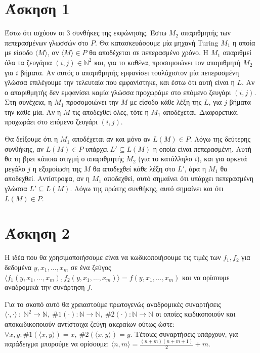 \documentclass[a4paper, oneside, 11pt]{article}
\theoremstyle{definition}
\begin{document}


\section*{Άσκηση 1}
Έστω ότι ισχύουν οι 3 συνθήκες της εκφώνησης. Έστω $M_2$ απαριθμητής των πεπερασμένων γλωσσών στο $P$. Θα κατασκευάσουμε μία μηχανή Turing $M_1$ η οποία
με είσοδο $\langle M\rangle$, αν $\langle M\rangle\in P$ θα αποδέχεται σε πεπερασμένο χρόνο. Η $M_1$ απαριθμεί όλα τα ζευγάρια
$(i,j)\in \mathbb{N}^2$ και, για το καθένα, προσομοιώνει τον απαριθμητή $M_2$ για $i$ βήματα. Αν αυτός ο απαριθμητής εμφανίσει τουλάχιστον μία
πεπερασμένη γλώσσα επιλέγουμε την τελευταία που εμφανίστηκε, και έστω ότι αυτή είναι η $L$. Αν ο απαριθμητής δεν εμφανίσει καμία γλώσσα προχωράμε στο
επόμενο ζευγάρι $(i,j)$. Στη συνέχεια, η $M_1$ προσομοιώνει την $M$ με είσοδο κάθε λέξη της $L$, για $j$ βήματα την κάθε μία. Αν η $M$ τις αποδεχθεί
όλες, τότε η $M_1$ αποδέχεται. Διαφορετικά, προχωράει στο επόμενο ζευγάρι $(i,j)$.

Θα δείξουμε ότι η $M_1$ αποδέχεται αν και μόνο αν $L(M)\in P$. Λόγω της δεύτερης συνθήκης, αν $L(M)\in P$
υπάρχει $L'\subseteq L(M)$ η οποία είναι πεπερασμένη.
Αυτή θα τη βρει κάποια στιγμή ο απαριθμητής $M_2$ (για το κατάλληλο $i$), και για αρκετά μεγάλο $j$ η εξομοίωση της $M$ θα αποδεχθεί κάθε λέξη
στο $L'$, άρα η $M_1$ θα αποδεχθεί. Αντίστροφα, αν η $M_1$ αποδεχθεί, αυτό σημαίνει ότι υπάρχει πεπερασμένη γλώσσα $L'\subseteq L(M)$. Λόγω της πρώτης
συνθήκης, αυτό σημαίνει και ότι $L(M)\in P$.

\section*{Άσκηση 2}
Η ιδέα που θα χρησιμοποιήσουμε είναι να κωδικοποιήσουμε τις τιμές των $f_1, f_2$
για δεδομένα $y, x_1, \ldots, x_m$ σε ένα ζεύγος $\langle f_1(y, x_1, \ldots,
x_m), f_2(y, x_1, \ldots, x_m) \rangle = f(y, x_1, \ldots, x_m)$ και να ορίσουμε
αναδρομικά την συνάρτηση $f$.

Για το σκοπό αυτό θα χρειαστούμε πρωτογενώς αναδρομικές συναρτήσεις $\langle
\cdot, \cdot \rangle\ :\ \mathbb{N}^2 \rightarrow \mathbb{N},\ \#1(\cdot) :
\mathbb{N} \rightarrow \mathbb{N},\ \#2(\cdot) : \mathbb{N} \rightarrow
\mathbb{N}$ οι οποίες κωδικοποιούν και αποκωδικοποιούν αντίστοιχα ζεύγη ακεραίων
ούτως ώστε: $\forall x, y : \#1( \langle x, y \rangle ) = x,\ \#2(\langle x, y
\rangle) = y$. Τέτοιες συναρτήσεις υπάρχουν, για παράδειγμα μπορούμε να
ορίσουμε: $\langle n, m \rangle = \frac{ (n+m)(n+m+1) }{2} + m$.
\end{document}
